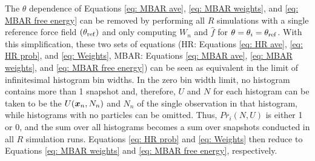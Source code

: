 \documentclass[journal=jced,manuscript=article]{achemso}
\newcommand{\bfv}[1]{{\mbox{\boldmath{$#1$}}}}
\newcommand{\x}{\bfv{x}}
\begin{document}
The $\theta$ dependence of Equations \ref{eq: MBAR ave}, \ref{eq: MBAR weights}, and \ref{eq: MBAR free energy} can be removed by performing all $R$ simulations with a single reference force field $(\theta_{\rm ref})$ and only computing $W_{n}$ and $\hat f$ for $\theta = \theta_i = \theta_{\rm ref}$. With this simplification, these two sets of equations (HR: Equations \ref{eq: HR ave}, \ref{eq: HR prob}, and \ref{eq: Weights}, MBAR: Equations \ref{eq: MBAR ave}, \ref{eq: MBAR weights}, and \ref{eq: MBAR free energy}) can be seen as equivalent in the limit of infinitesimal histogram bin widths. In the zero bin width limit, no histogram contains more than 1 snapshot and, therefore, $U$ and $N$ for each histogram can be taken to be the $U(\x_n,N_n)$ and $N_n$ of the single observation in that histogram, while histograms with no particles can be omitted. Thus, $Pr_i(N,U)$ is either 1 or 0, and the sum over all histograms becomes a sum over snapshots conducted in all $R$ simulation runs. Equations \ref{eq: HR prob} and \ref{eq: Weights} then reduce to Equations \ref{eq: MBAR weights} and \ref{eq: MBAR free energy}, respectively.

\end{document}
